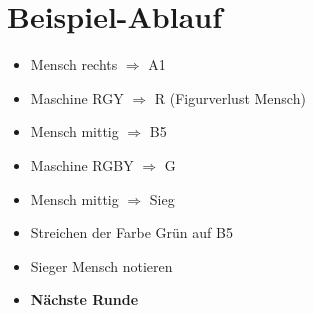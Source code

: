 \documentclass[12pt]{scrreprt}
\begin{document}
\newpage

\section*{Beispiel-Ablauf}

\begin{itemize}
	\item Mensch rechts $\Rightarrow$ A1
	\item Maschine RGY $\Rightarrow$ R (Figurverlust Mensch)
	\item Mensch mittig $\Rightarrow$ B5
	\item Maschine RGBY $\Rightarrow$ G
	\item Mensch mittig $\Rightarrow$ Sieg
	\item Streichen der Farbe Grün auf B5
	\item Sieger Mensch notieren
	\item \textbf{Nächste Runde}
\end{itemize}
\end{document}
